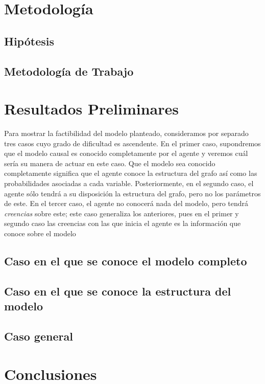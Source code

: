\documentclass[11pt]{article}
\theoremstyle{plain}
\begin{document}
\section{Metodología}
	\subsection{Hipótesis}
	\subsection{Metodología de Trabajo}

\section{Resultados Preliminares}
Para mostrar la factibilidad del modelo planteado, consideramos por separado tres casos cuyo grado de dificultad es ascendente. En el primer caso, supondremos que el modelo causal es conocido completamente por el agente y veremos cuál sería su manera de actuar en este caso. Que el modelo sea conocido completamente significa que el agente conoce la estructura del grafo así como las probabilidades asociadas a cada variable. Posteriormente, en el segundo caso, el agente sólo tendrá a su disposición la estructura del grafo, pero no los parámetros de este. En el tercer caso, el agente no conocerá nada del modelo, pero tendrá \textit{creencias} sobre este; este caso generaliza los anteriores, pues en el primer y segundo caso las creencias con las que inicia el agente es la información que conoce sobre el modelo
\subsection{Caso en el que se conoce el modelo completo}
\subsection{Caso en el que se conoce la estructura del modelo}
\subsection{Caso general}
\section{Conclusiones}



\end{document}
